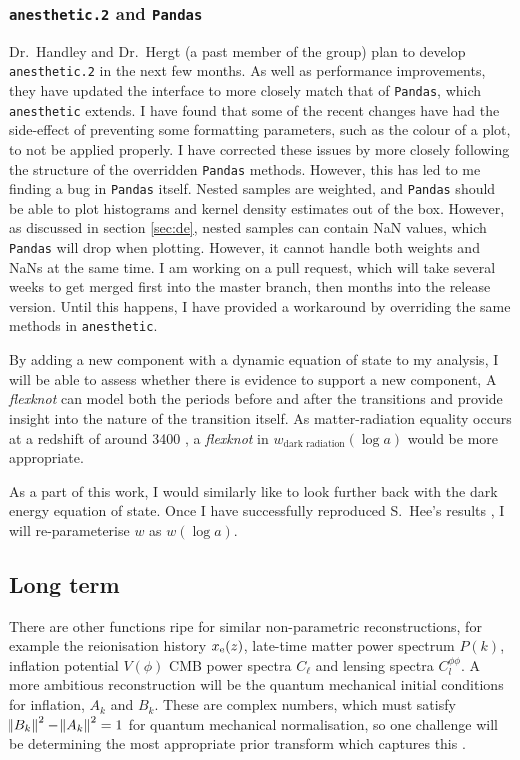 \documentclass{article}
\begin{document}
\subsubsection{\texttt{anesthetic.2} and \texttt{Pandas}}

Dr.~Handley and Dr.~Hergt (a past member of the group) plan to develop \texttt{anesthetic.2} in the next few months. As well as performance improvements, they have updated the interface to more closely match that of \texttt{Pandas}, which \texttt{anesthetic} extends. I have found that some of the recent changes have had the side-effect of preventing some formatting parameters, such as the colour of a plot, to not be applied properly. I have corrected these issues by more closely following the structure of the overridden \texttt{Pandas} methods. However, this has led to me finding a bug in \texttt{Pandas} itself. Nested samples are weighted, and \texttt{Pandas} should be able to plot histograms and kernel density estimates out of the box. However, as discussed in section \ref{sec:de}, nested samples can contain NaN values, which \texttt{Pandas} will drop when plotting. However, it cannot handle both weights and NaNs at the same time. I am working on a pull request, which will take several weeks to get merged first into the master branch, then months into the release version. Until this happens, I have provided a workaround by overriding the same methods in \texttt{anesthetic}.

By adding a new component with a dynamic equation of state to my analysis, I will be able to assess whether there is evidence to support a new component, 
A \textit{flexknot} can model both the periods before and after the transitions and provide insight into the nature of the transition itself. As matter-radiation equality occurs at a redshift of around 3400 \cite{planck_6}, a \textit{flexknot} in $w_\textrm{dark radiation}(\log{a})$ would be more appropriate. 


As a part of this work, I would similarly like to look further back with the dark energy equation of state. Once I have successfully reproduced S.~Hee's results \cite{Sonke}, I will re-parameterise $w$ as $w(\log{a})$.

\subsection{Long term}

There are other functions ripe for similar non-parametric reconstructions, for example the reionisation history $x_\textrm e(z)$, late-time matter power spectrum $P(k)$, inflation potential $V(\phi)$ CMB power spectra $C_\ell$ and lensing spectra $C_l^{\phi\phi}$. A more ambitious reconstruction will be the quantum mechanical initial conditions for inflation, $A_k$ and $B_k$. These are complex numbers, which must satisfy $\norm{B_k}^2-\norm{A_k}^2=1$ for quantum mechanical normalisation, so one challenge will be determining the most appropriate prior transform which captures this \cite{shumaylov2022}.
\end{document}
